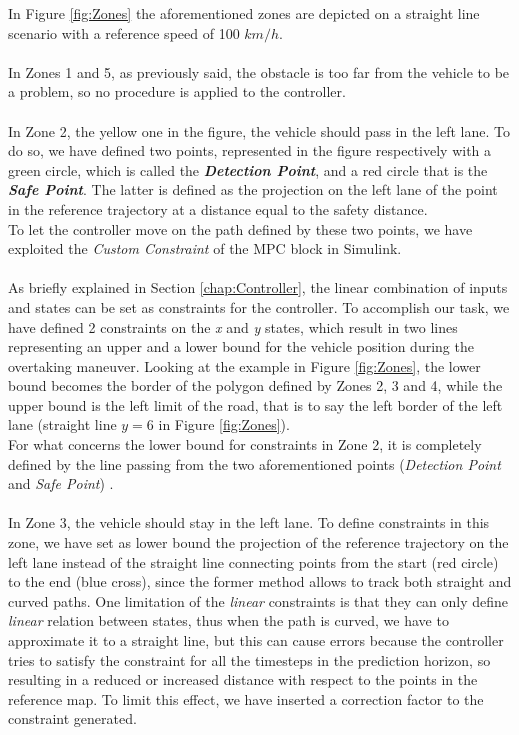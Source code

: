 In Figure \ref{fig:Zones} the aforementioned zones are depicted on a straight line scenario with a reference speed of 100 $km/h$.\\\\
In Zones 1 and 5, as previously said, the obstacle is too far from the vehicle to be a problem, so no procedure is applied to the controller.\\\\
In Zone 2, the yellow one in the figure, the vehicle should pass in the left lane. To do so, we have defined two points, represented in the figure respectively with a green circle, which is called the \textbf{\textit{Detection Point}}, and a red circle that is the \textbf{\textit{Safe Point}}.
The latter is defined as the projection on the left lane of the point in the reference trajectory at a distance equal to the safety distance. \\To let the controller move on the path defined by these two points, we have exploited the \textit{Custom Constraint} of the MPC block in Simulink.\\\\
As briefly explained in Section \ref{chap:Controller}, the linear combination of inputs and states can be set as constraints for the controller. To accomplish our task, we have defined 2 constraints on the \textit{x} and \textit{y} states, which result in two lines representing an upper and a lower bound for the vehicle position during the overtaking maneuver. Looking at the example in Figure \ref{fig:Zones}, the lower bound becomes the border of the polygon defined by Zones 2, 3 and 4, while the upper bound is the left limit of the road, that is to say the left border of the left lane (straight line $y=6$ in Figure \ref{fig:Zones}).\\
For what concerns the lower bound for constraints in Zone 2, it is completely defined by the line passing from the two aforementioned points (\textit{Detection Point} and \textit{Safe Point}) .\\\\
In Zone 3, the vehicle should stay in the left lane. To define constraints in this zone, we have set as lower bound the projection of the reference trajectory on the left lane instead of the straight line connecting points from the start (red circle) to the end (blue cross), since the former method allows to track both straight and curved paths. One limitation of the \textit{linear} constraints is that they can only define \textit{linear} relation between states, thus when the path is curved, we have to approximate it to a straight line, but this can cause errors because the controller tries to satisfy the constraint for all the timesteps in the prediction horizon, so resulting in a reduced or increased distance with respect to the points in the reference map. To limit this effect, we have inserted a correction factor to the constraint generated.
